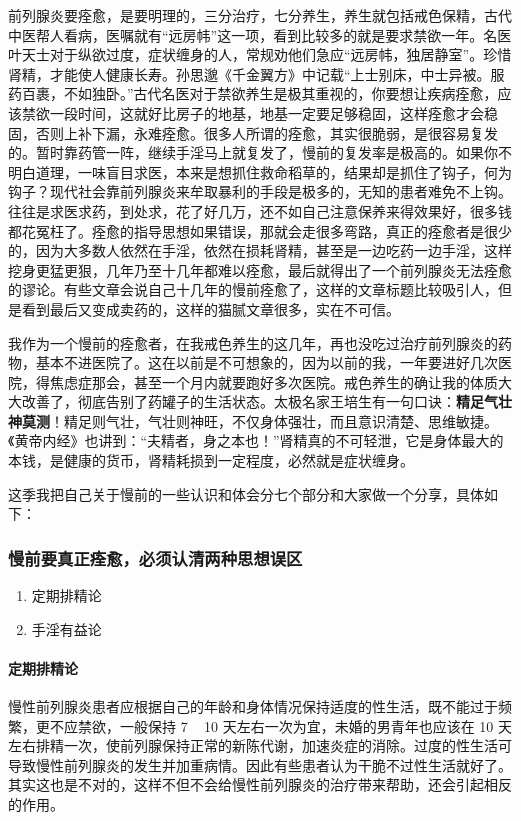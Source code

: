 \documentclass{ctexart}
\begin{document}
前列腺炎要痊愈，是要明理的，三分治疗，七分养生，养生就包括戒色保精，古代中医帮人看病，医嘱就有“远房帏”这一项，看到比较多的就是要求禁欲一年。名医叶天士对于纵欲过度，症状缠身的人，常规劝他们急应“远房帏，独居静室”。珍惜肾精，才能使人健康长寿。孙思邈《千金翼方》中记载“上士别床，中士异被。服药百裹，不如独卧。”古代名医对于禁欲养生是极其重视的，你要想让疾病痊愈，应该禁欲一段时间，这就好比房子的地基，地基一定要足够稳固，这样痊愈才会稳固，否则上补下漏，永难痊愈。很多人所谓的痊愈，其实很脆弱，是很容易复发的。暂时靠药管一阵，继续手淫马上就复发了，慢前的复发率是极高的。如果你不明白道理，一味盲目求医，本来是想抓住救命稻草的，结果却是抓住了钩子，何为钩子？现代社会靠前列腺炎来牟取暴利的手段是极多的，无知的患者难免不上钩。往往是求医求药，到处求，花了好几万，还不如自己注意保养来得效果好，很多钱都花冤枉了。痊愈的指导思想如果错误，那就会走很多弯路，真正的痊愈者是很少的，因为大多数人依然在手淫，依然在损耗肾精，甚至是一边吃药一边手淫，这样挖身更猛更狠，几年乃至十几年都难以痊愈，最后就得出了一个前列腺炎无法痊愈的谬论。有些文章会说自己十几年的慢前痊愈了，这样的文章标题比较吸引人，但是看到最后又变成卖药的，这样的猫腻文章很多，实在不可信。

我作为一个慢前的痊愈者，在我戒色养生的这几年，再也没吃过治疗前列腺炎的药物，基本不进医院了。这在以前是不可想象的，因为以前的我，一年要进好几次医院，得焦虑症那会，甚至一个月内就要跑好多次医院。戒色养生的确让我的体质大大改善了，彻底告别了药罐子的生活状态。太极名家王培生有一句口诀：\textbf{精足气壮神莫测}！精足则气壮，气壮则神旺，不仅身体强壮，而且意识清楚、思维敏捷。《黄帝内经》也讲到：“夫精者，身之本也！”肾精真的不可轻泄，它是身体最大的本钱，是健康的货币，肾精耗损到一定程度，必然就是症状缠身。

这季我把自己关于慢前的一些认识和体会分七个部分和大家做一个分享，具体如下：

\subsubsection{慢前要真正痊愈，必须认清两种思想误区}

\begin{multicols}{2}
    \begin{enumerate}
        \item 定期排精论
        \item 手淫有益论
    \end{enumerate}
\end{multicols}

\paragraph{定期排精论} 慢性前列腺炎患者应根据自己的年龄和身体情况保持适度的性生活，既不能过于频繁，更不应禁欲，一般保持 7 ~ 10 天左右一次为宜，未婚的男青年也应该在 10 天左右排精一次，使前列腺保持正常的新陈代谢，加速炎症的消除。过度的性生活可导致慢性前列腺炎的发生并加重病情。因此有些患者认为干脆不过性生活就好了。其实这也是不对的，这样不但不会给慢性前列腺炎的治疗带来帮助，还会引起相反的作用。
\end{document}
